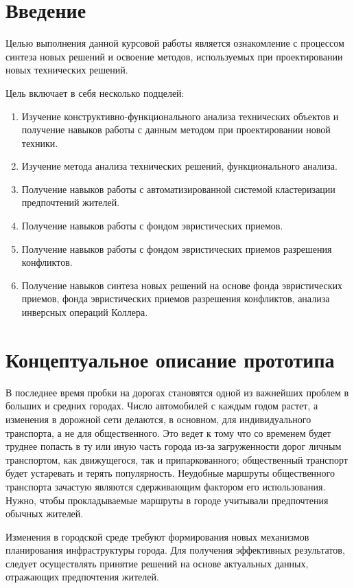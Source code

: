 \chapter{Введение}
Целью выполнения данной курсовой работы является ознакомление с процессом
синтеза новых решений и освоение методов, используемых при проектировании новых
технических решений.

Цель включает в себя несколько подцелей:
\begin{enumerate}
  \item Изучение конструктивно-функционального анализа технических объектов и
    получение навыков работы с данным методом при проектировании новой техники.
  \item Изучение метода анализа технических решений, функционального
    анализа. 
  \item Получение навыков работы с автоматизированной системой кластеризации
    предпочтений жителей.
  \item Получение навыков работы с фондом эвристических приемов.
  \item Получение навыков работы с фондом эвристических приемов разрешения
    конфликтов.
  \item Получение навыков синтеза новых решений на основе фонда эвристических
    приемов, фонда эвристических приемов разрешения конфликтов, анализа
    инверсных операций Коллера.
\end{enumerate}

\chapter{Концептуальное описание прототипа}
В последнее время пробки на дорогах становятся одной из важнейших проблем в
больших и средних городах. Число автомобилей с каждым годом растет, а изменения
в дорожной сети делаются, в основном, для индивидуального транспорта, а не
для общественного. Это ведет к тому что со временем будет труднее попасть в ту
или иную часть города из-за загруженности дорог личным транспортом, как
движущегося, так и припаркованного; общественный транспорт будет устаревать и
терять популярность. Неудобные маршруты общественного транспорта зачастую
являются сдерживающим фактором его использования. Нужно, чтобы прокладываемые
маршруты в городе учитывали предпочтения обычных жителей. 

Изменения в городской среде требуют формирования новых механизмов планирования
инфраструктуры города. Для получения эффективных результатов, следует
осуществлять принятие решений на основе актуальных данных, отражающих
предпочтения жителей.

